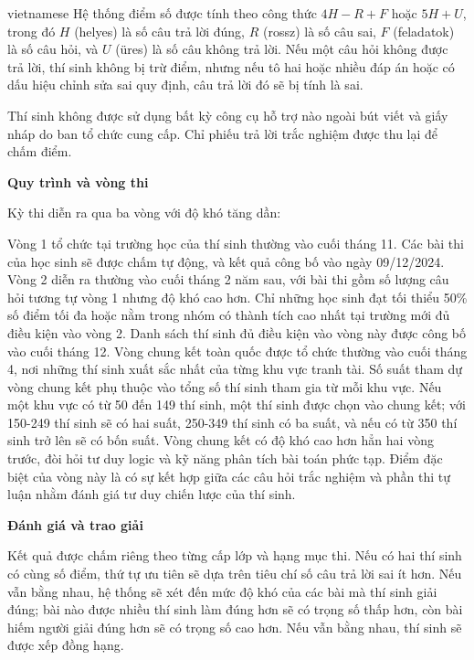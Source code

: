 \documentclass{article}
\begin{document}
\begin{otherlanguage*}{vietnamese}
Hệ thống điểm số được tính theo công thức $4H - R + F$ hoặc $5H + U$, trong đó $H$ (helyes) là số câu trả lời đúng, $R$ (rossz) là số câu sai, $F$ (feladatok) là số câu hỏi,
và $U$ (üres) là số câu không trả lời. Nếu một câu hỏi không được trả lời, thí sinh không bị trừ điểm, nhưng nếu tô hai hoặc nhiều đáp án hoặc có dấu hiệu chỉnh sửa sai quy định,
câu trả lời đó sẽ bị tính là sai.

Thí sinh không được sử dụng bất kỳ công cụ hỗ trợ nào ngoài bút viết và giấy nháp do ban tổ chức cung cấp. Chỉ phiếu trả lời trắc nghiệm được thu lại để chấm điểm.

\textbf{Quy trình và vòng thi}

Kỳ thi diễn ra qua ba vòng với độ khó tăng dần:
\begin{enumerate}[topsep=0pt, partopsep=0pt, itemsep=0pt]
    \ii Vòng 1 tổ chức tại trường học của thí sinh thường vào cuối tháng 11. Các bài thi của học sinh sẽ được chấm tự động, và kết quả công bố vào ngày 09/12/2024.
    \ii Vòng 2 diễn ra thường vào cuối tháng 2 năm sau, với bài thi gồm số lượng câu hỏi tương tự vòng 1 nhưng độ khó cao hơn.
    Chỉ những học sinh đạt tối thiểu 50\% số điểm tối đa hoặc nằm trong nhóm có thành tích cao nhất tại trường mới đủ điều kiện vào vòng 2.
    Danh sách thí sinh đủ điều kiện vào vòng này được công bố vào cuối tháng 12.
    \ii Vòng chung kết toàn quốc được tổ chức thường vào cuối tháng 4, nơi những thí sinh xuất sắc nhất của từng khu vực tranh tài.
    Số suất tham dự vòng chung kết phụ thuộc vào tổng số thí sinh tham gia từ mỗi khu vực.
    Nếu một khu vực có từ 50 đến 149 thí sinh, một thí sinh được chọn vào chung kết; với 150-249 thí sinh sẽ có hai suất, 250-349 thí sinh có ba suất,
    và nếu có từ 350 thí sinh trở lên sẽ có bốn suất.
    Vòng chung kết có độ khó cao hơn hẳn hai vòng trước, đòi hỏi tư duy logic và kỹ năng phân tích bài toán phức tạp.
    Điểm đặc biệt của vòng này là có sự kết hợp giữa các câu hỏi trắc nghiệm và phần thi tự luận nhằm đánh giá tư duy chiến lược của thí sinh.
\end{enumerate}

\textbf{Đánh giá và trao giải}

Kết quả được chấm riêng theo từng cấp lớp và hạng mục thi. Nếu có hai thí sinh có cùng số điểm, thứ tự ưu tiên sẽ dựa trên tiêu chí số câu trả lời sai ít hơn.
Nếu vẫn bằng nhau, hệ thống sẽ xét đến mức độ khó của các bài mà thí sinh giải đúng; bài nào được nhiều thí sinh làm đúng hơn sẽ có trọng số thấp hơn,
còn bài hiếm người giải đúng hơn sẽ có trọng số cao hơn. Nếu vẫn bằng nhau, thí sinh sẽ được xếp đồng hạng.


\end{otherlanguage*}
\end{document}
